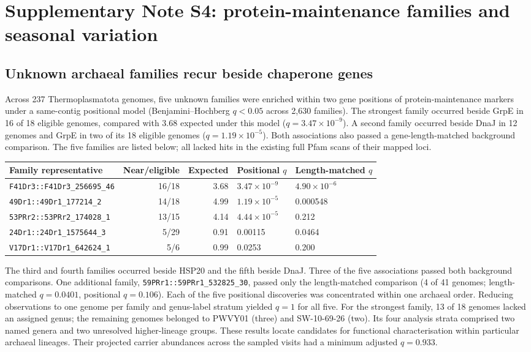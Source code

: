 \section*{Supplementary Note S4: protein-maintenance families and seasonal variation}

\subsection*{Unknown archaeal families recur beside chaperone genes}

Across 237 Thermoplasmatota genomes, five unknown families were enriched within two gene positions of protein-maintenance markers under a same-contig positional model (Benjamini--Hochberg $q<0.05$ across 2{,}630 families). The strongest family occurred beside GrpE in 16 of 18 eligible genomes, compared with 3.68 expected under this model ($q=3.47\times10^{-9}$). A second family occurred beside DnaJ in 12 genomes and GrpE in two of its 18 eligible genomes ($q=1.19\times10^{-5}$). Both associations also passed a gene-length-matched background comparison. The five families are listed below; all lacked hits in the existing full Pfam scans of their mapped loci.

\begin{center}
\small
\begin{tabular}{@{}lrrll@{}}
\toprule
Family representative & Near/eligible & Expected & Positional $q$ & Length-matched $q$ \\
\midrule
\texttt{F41Dr3::F41Dr3\_256695\_46} & 16/18 & 3.68 & $3.47\times10^{-9}$ & $4.90\times10^{-6}$ \\
\texttt{49Dr1::49Dr1\_177214\_2} & 14/18 & 4.99 & $1.19\times10^{-5}$ & 0.000548 \\
\texttt{53PRr2::53PRr2\_174028\_1} & 13/15 & 4.14 & $4.44\times10^{-5}$ & 0.212 \\
\texttt{24Dr1::24Dr1\_1575644\_3} & 5/29 & 0.91 & 0.00115 & 0.0464 \\
\texttt{V17Dr1::V17Dr1\_642624\_1} & 5/6 & 0.99 & 0.0253 & 0.200 \\
\bottomrule
\end{tabular}
\end{center}

The third and fourth families occurred beside HSP20 and the fifth beside DnaJ. Three of the five associations passed both background comparisons. One additional family, \texttt{59PRr1::}\allowbreak\texttt{59PRr1\_532825\_30}, passed only the length-matched comparison (4 of 41 genomes; length-matched $q=0.0401$, positional $q=0.106$). Each of the five positional discoveries was concentrated within one archaeal order. Reducing observations to one genome per family and genus-label stratum yielded $q=1$ for all five. For the strongest family, 13 of 18 genomes lacked an assigned genus; the remaining genomes belonged to PWVY01 (three) and SW-10-69-26 (two). Its four analysis strata comprised two named genera and two unresolved higher-lineage groups. These results locate candidates for functional characterisation within particular archaeal lineages. Their projected carrier abundances across the sampled visits had a minimum adjusted $q=0.933$.

